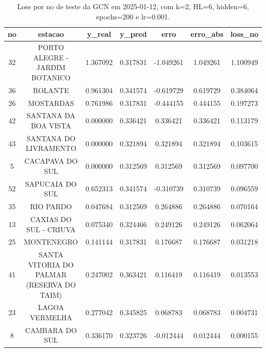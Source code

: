 \begin{table}[h]
\centering
\caption{Loss por no de teste da GCN em 2025-01-12, com k=2, HL=6, hidden=6, epochs=200 e lr=0.001.}
\label{tab:gcn_loss_k2_hl6_h6_e200_d20250112}
\begin{tabular}{ccccccc}
\toprule
no & estacao & y\_real & y\_pred & erro & erro\_abs & loss\_no \\
\midrule
32 & PORTO ALEGRE - JARDIM BOTANICO & 1.367092 & 0.317831 & -1.049261 & 1.049261 & 1.100949 \\
36 & ROLANTE & 0.961304 & 0.341574 & -0.619729 & 0.619729 & 0.384064 \\
26 & MOSTARDAS & 0.761986 & 0.317831 & -0.444155 & 0.444155 & 0.197273 \\
42 & SANTANA DA BOA VISTA & 0.000000 & 0.336421 & 0.336421 & 0.336421 & 0.113179 \\
43 & SANTANA DO LIVRAMENTO & 0.000000 & 0.321894 & 0.321894 & 0.321894 & 0.103615 \\
5 & CACAPAVA DO SUL & 0.000000 & 0.312569 & 0.312569 & 0.312569 & 0.097700 \\
52 & SAPUCAIA DO SUL & 0.652313 & 0.341574 & -0.310739 & 0.310739 & 0.096559 \\
35 & RIO PARDO & 0.047684 & 0.312569 & 0.264886 & 0.264886 & 0.070164 \\
13 & CAXIAS DO SUL - CRIUVA & 0.075340 & 0.324466 & 0.249126 & 0.249126 & 0.062064 \\
25 & MONTENEGRO & 0.141144 & 0.317831 & 0.176687 & 0.176687 & 0.031218 \\
41 & SANTA VITORIA DO PALMAR (RESERVA DO TAIM) & 0.247002 & 0.363421 & 0.116419 & 0.116419 & 0.013553 \\
23 & LAGOA VERMELHA & 0.277042 & 0.345825 & 0.068783 & 0.068783 & 0.004731 \\
8 & CAMBARA DO SUL & 0.336170 & 0.323726 & -0.012444 & 0.012444 & 0.000155 \\
\bottomrule
\end{tabular}
\end{table}
